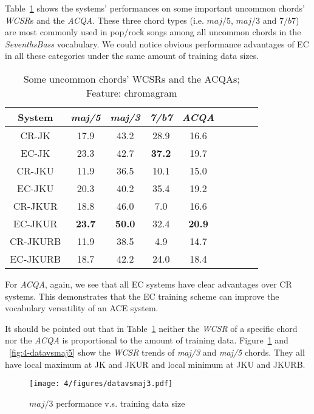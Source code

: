  \label{sec:4-scper}
Table~\ref{tab:4-ltres} shows the systems' performances on some important uncommon chords' \textit{WCSR}s and the \textit{ACQA}. These three chord types (i.e. $maj/5$, $maj/3$ and $7/b7$) are most commonly used in pop/rock songs among all uncommon chords in the \textit{SeventhsBass} vocabulary. We could notice obvious performance advantages of EC in all these categories under the same amount of training data sizes.
\begin{table}[htb]
	\centering
	\scriptsize
	\begin{tabular}{|c|c|c|c|c|c|c|c|c|}\hline
		System & \textit{maj/5} & \textit{maj/3} & \textit{7/b7} & \textit{ACQA}\\ \hline
		CR-JK & 17.9 & 43.2 & 28.9 & 16.6\\ \hline
		EC-JK & 23.3 & 42.7 & \textbf{37.2} & 19.7\\ \hline
		CR-JKU & 11.9 & 36.5 & 10.1 & 15.0\\ \hline
		EC-JKU & 20.3 & 40.2 & 35.4 & 19.2\\ \hline
		CR-JKUR & 18.8 & 46.0 & 7.0 & 16.6\\ \hline
		EC-JKUR & \textbf{23.7} & \textbf{50.0} & 32.4 & \textbf{20.9}\\ \hline
		CR-JKURB & 11.9 & 38.5 & 4.9 & 14.7\\ \hline
		EC-JKURB & 18.7 & 42.2 & 24.0 & 18.4\\ \hline
	\end{tabular}
	\caption{Some uncommon chords' WCSRs and the ACQAs; Feature: chromagram}
	\label{tab:4-ltres}
\end{table}

For \textit{ACQA}, again, we see that all EC systems have clear advantages over CR systems. This demonstrates that the EC training scheme can improve the vocabulary versatility of an ACE system.

It should be pointed out that in Table~\ref{tab:4-ltres} neither the \textit{WCSR} of a specific chord nor the \textit{ACQA} is proportional to the amount of training data. Figure~\ref{fig:4-datavsmaj3} and ~\ref{fig:4-datavsmaj5} show the \textit{WCSR} trends of \textit{maj/3} and \textit{maj/5} chords. They all have local maximum at JK and JKUR and local minimum at JKU and JKURB.

\begin{figure}[htb]
	\centering
	\texttt{[image: 4/figures/datavsmaj3.pdf]}
	\caption{$maj/3$ performance v.s. training data size}
	\label{fig:4-datavsmaj3}
\end{figure}

